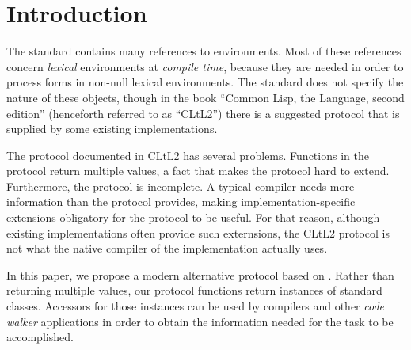 \section{Introduction}

The \commonlisp{} standard \cite{ansi:common:lisp} contains many
references to environments.  Most of these references concern
\emph{lexical} environments at \emph{compile time}, because they are
needed in order to process forms in non-null lexical environments.
The standard does not specify the nature of these objects, though in
the book ``Common Lisp, the Language, second edition''
\cite{Steele:1990:CLL:95411} (henceforth referred to as ``CLtL2'')
there is a suggested protocol that is supplied by some existing
\commonlisp{} implementations.

The protocol documented in CLtL2 has several problems.  Functions in
the protocol return multiple values, a fact that makes the protocol
hard to extend.  Furthermore, the protocol is incomplete.  A typical
compiler needs more information than the protocol provides, making
implementation-specific extensions obligatory for the protocol to be
useful.  For that reason, although existing \commonlisp{}
implementations often provide such externsions, the CLtL2 protocol is
not what the native compiler of the implementation actually uses.

In this paper, we propose a modern alternative protocol based on
\clos{}.  Rather than returning multiple values, our protocol
functions return instances of standard classes.  Accessors for those
instances can be used by compilers and other \emph{code walker}
applications in order to obtain the information needed for the task to
be accomplished.


